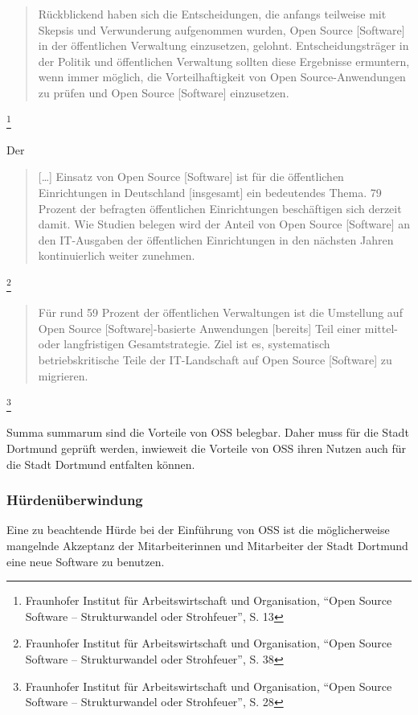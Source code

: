 \documentclass[a4paper]{scrartcl}
\begin{document}
\begin{quote}Rückblickend haben sich die Entscheidungen, die anfangs teilweise
  mit Skepsis und Verwunderung aufgenommen wurden, Open Source [Software] in der
  öffentlichen Verwaltung einzusetzen, gelohnt. Entscheidungsträger in der
  Politik und öffentlichen Verwaltung sollten diese Ergebnisse ermuntern, wenn
  immer möglich, die Vorteilhaftigkeit von Open Source-Anwendungen zu prüfen und
  Open Source [Software] einzusetzen.\end{quote}\footnote{Fraunhofer Institut
  für Arbeitswirtschaft und Organisation, ``Open Source Software --
  Strukturwandel oder Strohfeuer'', S. 13}

Der \begin{quote} [\ldots] Einsatz von Open Source [Software] ist für die
  öffentlichen Einrichtungen in Deutschland [insgesamt] ein bedeutendes
  Thema. 79 Prozent der befragten öffentlichen Einrichtungen beschäftigen sich
  derzeit damit. Wie Studien belegen wird der Anteil von Open Source [Software]
  an den IT-Ausgaben der öffentlichen Einrichtungen in den nächsten Jahren
  kontinuierlich weiter zunehmen.\end{quote}\footnote{Fraunhofer Institut für
  Arbeitswirtschaft und Organisation, ``Open Source Software -- Strukturwandel
  oder Strohfeuer'', S. 38}

\begin{quote}Für rund 59 Prozent der öffentlichen Verwaltungen ist die
  Umstellung auf Open Source [Software]-basierte Anwendungen [bereits] Teil
  einer mittel- oder langfristigen Gesamtstrategie. Ziel ist es, systematisch
  betriebskritische Teile der IT-Landschaft auf Open Source [Software] zu
  migrieren.\end{quote}\footnote{Fraunhofer Institut für Arbeitswirtschaft und
  Organisation, ``Open Source Software -- Strukturwandel oder Strohfeuer'',
  S. 28}

Summa summarum sind die Vorteile von OSS belegbar. Daher muss für die Stadt
Dortmund geprüft werden, inwieweit die Vorteile von OSS ihren Nutzen auch für
die Stadt Dortmund entfalten können.

\subsubsection{Hürdenüberwindung}

Eine zu beachtende Hürde bei der Einführung von OSS ist die möglicherweise
mangelnde Akzeptanz der Mitarbeiterinnen und Mitarbeiter der Stadt Dortmund eine
neue Software zu benutzen.
\end{document}
